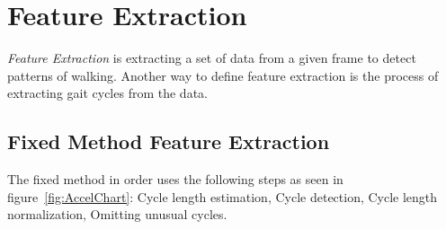 \documentclass{sig-alternate}
\begin{document}
\section{Feature Extraction}
	\textit{Feature Extraction} is extracting a set of data from a given frame to detect patterns of walking. Another way to define feature extraction is the process of extracting gait cycles from the data. 		%
\subsection{Fixed Method Feature Extraction}
	The fixed method in order uses the following steps as seen in figure~\ref{fig:AccelChart}: Cycle length estimation, Cycle detection, Cycle length normalization, Omitting unusual cycles.
\end{document}
